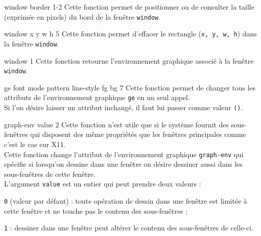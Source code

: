  {window border} {1-2}
Cette fonction permet de positionner ou de consulter la taille 
(exprim\'{e}e en pixels) du bord de la fen\^{e}tre {\tt window}.


 {window x y w h} {5}
Cette fonction permet d'effacer le rectangle ({\tt x, y, w, h}) dans
la fen\^{e}tre {\tt window}.    


\BeginHide

 {window} {1}
Cette fonction retourne l'environnement graphique associ\'{e} \`{a} la fen\^{e}tre
{\tt window}.


 {ge font mode pattern line-style fg bg} {7}
Cette fonction permet de changer tous les attributs de l'environnement
graphique {\tt ge} en un seul appel.\\
Si l'on d\'{e}sire laisser un attribut inchang\'{e}, il faut lui passer
comme valeur {\tt ()}.


 {graph-env value} {2}
Cette fonction n'est utile que si le syst\`{e}me fournit des sous-fen\^{e}tres
qui disposent des m\^{e}me propri\'{e}t\'{e}s que les fen\^{e}tres principales comme
c'est le cas sur X11.\\
Cette fonction change l'attribut de l'environnement graphique {\tt graph-env}
qui sp\'{e}cifie si lorsqu'on dessine dans une fen\^{e}tre on d\'{e}sire dessiner 
aussi dans les sous-fen\^{e}tres de cette fen\^{e}tre.\\
L'argument {\tt value} est un entier qui peut prendre deux valeurs :
\begin{Itemize}
\item {\tt 0} (valeur par d\'{e}faut) : toute op\'{e}ration de dessin dans une 
fen\^{e}tre est limit\'{e}e \`{a} cette fen\^{e}tre et ne touche pas le contenu
des sous-fen\^{e}tres ;
\item {\tt 1} : dessiner dans une fen\^{e}tre peut alt\'{e}rer le contenu des
sous-fen\^{e}tres de celle-ci.
\end{Itemize}


